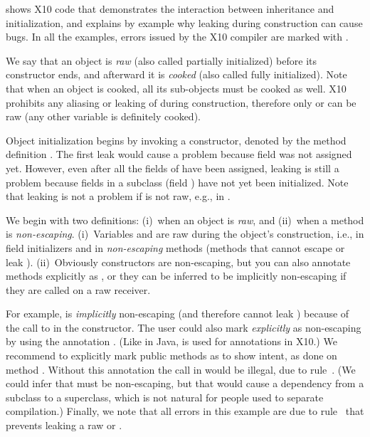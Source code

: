  shows X10 code that demonstrates the interaction
    between inheritance and initialization,
    and explains by example why leaking \this during construction can cause bugs.
In all the examples, errors issued by the X10 compiler are marked with .

We say that an object is \emph{raw} (also called partially initialized) before its constructor ends,
    and afterward it is \emph{cooked} (also called fully initialized).
Note that when an object is cooked, all its sub-objects must be cooked as well.
X10 prohibits any aliasing or leaking of \this during construction,
    therefore only \this or  can be raw (any other variable is definitely cooked).

Object initialization begins by invoking a constructor,
    denoted by the method definition .
The first leak would cause a problem because field  was not assigned yet.
However, even after all the fields of  have been assigned,
    leaking is still a problem
    because fields in a subclass (field ) have not yet been initialized.
Note that leaking is not a problem if \this is not raw, e.g., in .

We begin with two definitions:
    (i)~when an object is \emph{raw}, and
    (ii)~when a method is \emph{non-escaping}.
(i)~Variables \this and  are raw
    during the object's construction,
    i.e., in field initializers and in \emph{non-escaping} methods
    (methods that cannot escape or leak \this).
(ii)~Obviously constructors are non-escaping,
    but you can also annotate methods explicitly as ,
    or they can be inferred to be implicitly non-escaping
    if they are called on a raw \this receiver.

For example,  is \emph{implicitly} non-escaping (and therefore cannot leak \this)
    because of the call to 
    in the constructor.
The user could also mark  \emph{explicitly} as non-escaping by using the annotation
    .
(Like in Java,  is used for annotations in X10.)
We recommend to explicitly mark public methods as  to show intent,
    as done on method .
Without this annotation the call  in  would be illegal,
    due to rule~.
(We could infer that  must be non-escaping,
    but that would cause a dependency from a subclass to a superclass,
    which is not natural for people used to separate compilation.)
Finally, we note that all errors in this example are due to rule~
    that prevents leaking a raw \this or .




